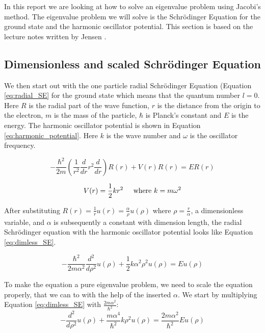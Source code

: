 In this report we are looking at how to solve an eigenvalue problem using Jacobi's method. The eigenvalue problem we will solve is the Schrödinger Equation for the ground state and the harmonic oscillator potential. This section is based on  the lecture notes written by Jensen \cite{Jensen}. 

\subsection{Dimensionless and scaled Schrödinger Equation}




We then start out with the one particle radial Schrödinger Equation (Equation \ref{eq:radial_SE} for the ground state which means that the quantum number $l = 0$. Here $R$ is the radial part of the wave function, $r$ is the distance from the origin to the electron, $m$ is the mass of the particle, $\hbar$ is Planck's constant and $E$ is the energy. The harmonic oscillator potential is shown in Equation \ref{eq:harmonic_potential}. Here $k$ is the wave number and $\omega$ is the oscillator frequency.

\begin{equation}\label{eq:radial_SE}
- \frac{\hbar^2}{2m}\left(\frac{1}{r^2}\frac{d}{dr}r^2\frac{d}{dr}\right)R(r) + V(r)R(r) = ER(r)
\end{equation}

\begin{equation}\label{eq:harmonic_potential}
V(r) = \frac{1}{2}kr^2 \hspace{0.5cm} \text{where } k = m \omega^2 
\end{equation}

After substituting $R(r) = \frac{1}{r}u(r) = \frac{\alpha}{\rho} u(\rho )$ where $\rho = \frac{r}{\alpha}$, a dimensionless variable, and $\alpha$ is subsequently a constant with dimension length, the radial Schrödinger equation with the harmonic oscillator potential looks like Equation \ref{eq:dimless_SE}.

\begin{equation}\label{eq:dimless_SE}
- \frac{\hbar^2}{2m\alpha^2}\frac{d^2}{d\rho^2}u(\rho ) + \frac{1}{2}k\alpha^2 \rho^2 u(\rho ) = Eu(\rho )
\end{equation}

To make the equation a pure eigenvalue problem, we need to scale the equation properly, that we can to with the help of the inserted $\alpha$. We start by multiplying Equation \ref{eq:dimless_SE} with $\frac{2m \alpha^2}{\hbar^2}$:
\[
-\frac{d^2}{d\rho^2}u(\rho ) + \frac{m\alpha^4}{\hbar^2}k\rho^2 u(\rho ) = \frac{2m\alpha^2}{\hbar^2}E u(\rho )
\]

